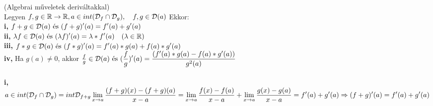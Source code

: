 \documentclass[a4paper,11pt]{article}
\begin{document}
\tetel (Algebrai műveletek deriváltakkal)\\[0.1cm]Legyen $f,g\in\displaystyle\mathbb{R}\to\mathbb{R},a\in int(\displaystyle\mathcal{D}_f\cap\displaystyle\mathcal{D}_g),\quad f,g\in\displaystyle\mathcal{D}(a)$ Ekkor:\\[0.2cm]\hspace*{0.7cm}\textbf{i,} $f+g\in\displaystyle\mathcal{D}(a)\text{ és }(f+g)'(a)=f'(a)+g'(a)$\\[0.1cm]\hspace*{0.7cm}\textbf{ii,} $\lambda f\in\displaystyle\mathcal{D}(a)\text{ és }(\lambda f)'(a)=\lambda*f'(a)\quad(\lambda\in\mathbb{R})$ \\[0.1cm]\hspace*{0.7cm}\textbf{iii,} $f*g\in\displaystyle\mathcal{D}(a)\text{ és }(f*g)'(a)= f'(a)*g(a)+f(a)*g'(a)$\\[0.1cm]\hspace*{0.7cm}\textbf{iv,} Ha $g(a)\neq0$, akkor $\frac{f}{g}\in\displaystyle\mathcal{D}(a)\text{ és } (\frac{f}{g})'(a) =\frac{(f'(a)*g(a)-f(a)*g'(a))}{g^2(a)}$\\[0.1cm]\biz\\[0.1cm]\hspace*{0.3cm}\textbf{i,} $a\in int(\displaystyle\mathcal{D}_f\cap\displaystyle\mathcal{D}_g)=int\displaystyle\mathcal{D}_{f+g}\\[0.2cm]\displaystyle\lim_{x\to a} \frac{(f+g)(x)-(f+g)(a)}{x-a}=\displaystyle\lim_{x\to a}\frac{f(x)-f(a)}{x-a}+\displaystyle\lim_{x\to a}\frac{g(x)-g(a)}{x-a}=f'(a)+g'(a) \\[0.2cm]\Rightarrow(f+g)'(a)=f'(a)+g'(a)$
\end{document}
